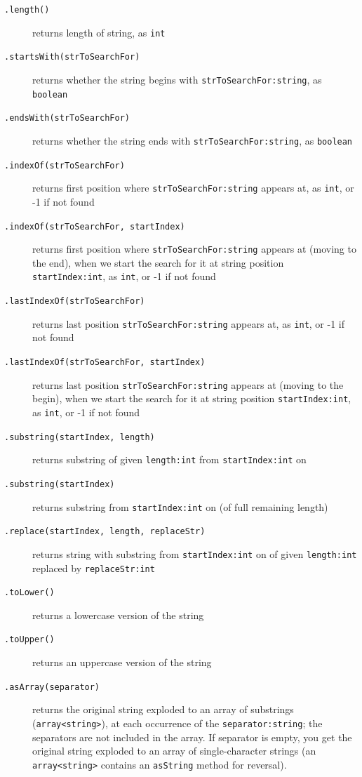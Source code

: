 \begin{description}
\item[\texttt{.length()}] returns length of string, as \texttt{int}
\item[\texttt{.startsWith(strToSearchFor)}] returns whether the string begins with \texttt{strToSearchFor:string}, as \texttt{boolean}
\item[\texttt{.endsWith(strToSearchFor)}] returns whether the string ends with \texttt{strToSearchFor:string}, as \texttt{boolean}
\item[\texttt{.indexOf(strToSearchFor)}] returns first position where \texttt{strToSearchFor:string} appears at, as \texttt{int}, or -1 if not found
\item[\texttt{.indexOf(strToSearchFor, startIndex)}] returns first position where \texttt{strToSearchFor:string} appears at (moving to the end), when we start the search for it at string position \texttt{startIndex:int}, as \texttt{int}, or -1 if not found
\item[\texttt{.lastIndexOf(strToSearchFor)}] returns last position \texttt{strToSearchFor:string} appears at, as \texttt{int}, or -1 if not found
\item[\texttt{.lastIndexOf(strToSearchFor, startIndex)}] returns last position \texttt{strToSearchFor:string} appears at (moving to the begin), when we start the search for it at string position \texttt{startIndex:int}, as \texttt{int}, or -1 if not found
\item[\texttt{.substring(startIndex, length)}] returns substring of given \texttt{length:int} from \texttt{startIndex:int} on
\item[\texttt{.substring(startIndex)}] returns substring from \texttt{startIndex:int} on (of full remaining length)
\item[\texttt{.replace(startIndex, length, replaceStr)}] returns string with substring from \texttt{startIndex:int} on of given \texttt{length:int} replaced by \texttt{replaceStr:int}
\item[\texttt{.toLower()}] returns a lowercase version of the string
\item[\texttt{.toUpper()}] returns an uppercase version of the string
\item[\texttt{.asArray(separator)}] returns the original string exploded to an array of substrings (\texttt{array<string>}), at each occurrence of the \texttt{separator:string}; the separators are not included in the array. If separator is empty, you get the original string exploded to an array of single-character strings (an \texttt{array<string>} contains an \texttt{asString} method for reversal). 
\end{description}

